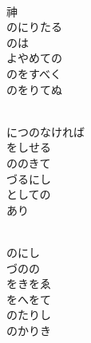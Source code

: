 \documentclass[10pt,b5j]{tarticle} %
\begin{document}
\vspace{1.5em} %
\newcommand{\linespace}{0.5em} %
\newcommand{\blocksize}{0.5\hsize} %
\newcommand{\itemmargin}{3em} %
\begin{enumerate} %
    \setlength{\itemindent}{\itemmargin} %
    \begin{minipage}[c]{\blocksize}
    
        \vspace{\linespace}
        \item~\\
        神\\
        のにりたる\\
        のは\\
        よやめての\\
        のをすべく\\
        のをりてぬ
        
    \end{minipage}
    \begin{minipage}[c]{\blocksize}
        
        \vspace{\linespace}
        \item~\\
        につのなければ\\
        をしせる\\
        ののきて\\
        づるにし\\
        としての\\
        あり
        
    \end{minipage}
    \begin{minipage}[c]{\blocksize}
        
        \vspace{\linespace}
        \item~\\
        のにし\\
        づのの\\
        をきをゑ\\
        をへをて\\
        のたりし\\
        のかりき
        

\end{minipage}
\end{enumerate}
\end{document}
